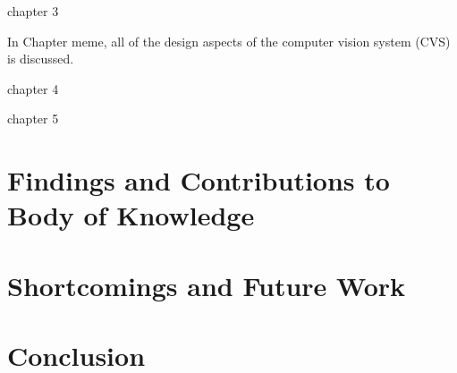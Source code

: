 chapter 3

In Chapter meme, all of the design aspects of the computer vision system (CVS) is discussed. 

chapter 4

chapter 5

\section{Findings and Contributions to Body of Knowledge}

\section{Shortcomings and Future Work}

\section{Conclusion}
